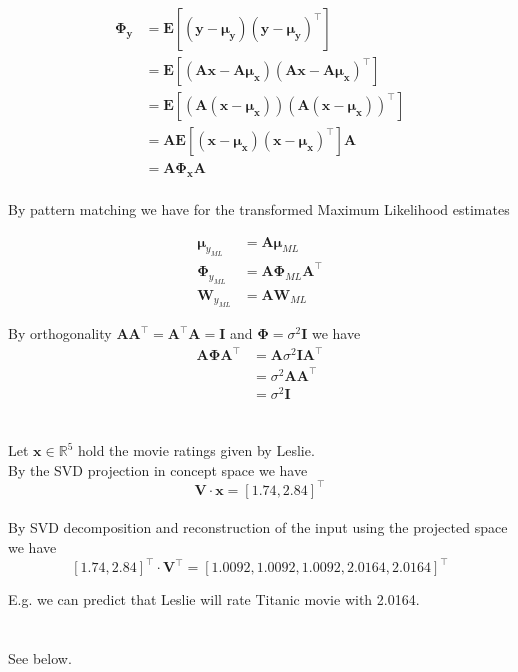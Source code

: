 \documentclass[11pt]{article}
\newcommand{\exercise}{\section{}}
\newcommand{\tf}[1]{{#1}^{\intercal}}
\begin{document}
\begin{align*}
\mathbf{\Phi_y} &= \mathbf{E}[ (\mathbf{y} - \mathbf{\mu_y}) \tf{(\mathbf{y} - \mathbf{\mu_y})} ] \\
&= \mathbf{E}[ ( \mathbf{A} \mathbf{x} - \mathbf{A} \mathbf{\mu_x} ) \tf{( \mathbf{A} \mathbf{x} - \mathbf{A} \mathbf{\mu_x} ) } ] \\
&= \mathbf{E}[ ( \mathbf{A} (\mathbf{x} - \mathbf{\mu_x}) ) \tf{( \mathbf{A} (\mathbf{x} - \mathbf{\mu_x}) ) } ] \\
&= \mathbf{A} \mathbf{E}[ ( \mathbf{x} - \mathbf{\mu_x} ) \tf{( \mathbf{x} - \mathbf{\mu_x} ) } ] \mathbf{A} \\
&= \mathbf{A} \mathbf{\Phi_x} \mathbf{A} \\
\end{align*}

\noindent By pattern matching we have for the transformed Maximum Likelihood estimates

\begin{align*}
\mathbf{\mu}_{y_{ML}} &= \mathbf{A} \mathbf{\mu}_{ML} \\
\mathbf{\Phi}_{y_{ML}} &= \mathbf{A} \mathbf{\Phi}_{ML} \tf{\mathbf{A}} \\
\mathbf{W}_{y_{ML}} &= \mathbf{A} \mathbf{W}_{ML}
\end{align*}

\noindent By orthogonality $ \mathbf{A} \tf{\mathbf{A}} = \tf{\mathbf{A}} \mathbf{A} = \mathbf{I}$ and $ \mathbf{\Phi} = \sigma^2  \mathbf{I}$ we have
\begin{align*}
\mathbf{A} \mathbf{\Phi} \tf{\mathbf{A}} &= \mathbf{A} \sigma^2  \mathbf{I} \tf{\mathbf{A}} \\
&= \sigma^2 \mathbf{A} \tf{\mathbf{A}} \\
&= \sigma^2 \mathbf{I}
\end{align*}

\exercise

Let $\mathbf{x} \in \mathbb{R}^5$ hold the movie ratings given by Leslie.
\\
\noindent By the SVD projection in concept space we have
$$\mathbf{V}  \cdot \mathbf{x} = \tf{[1.74, 2.84]}$$
\\
\noindent By SVD decomposition and reconstruction of the input using the projected space we have
$$ \tf{[1.74, 2.84]} \cdot \tf{\mathbf{V}} = \tf{[1.0092, 1.0092, 1.0092, 2.0164, 2.0164]} $$

\noindent E.g. we can predict that Leslie will rate Titanic movie with 2.0164.

\exercise

See below.
\end{document}
